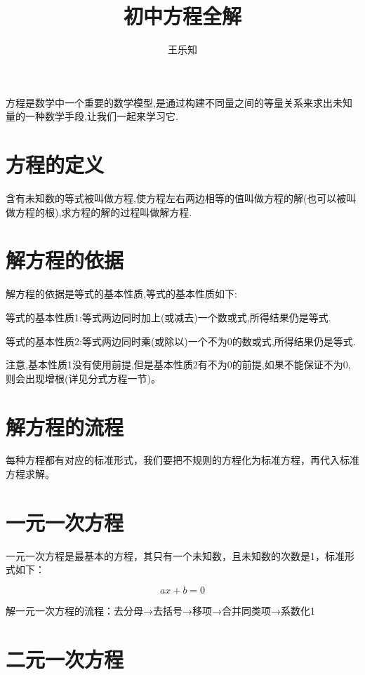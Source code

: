 \documentclass[UTF8]{ctexart}
\title{初中方程全解}
\author{王乐知}
\begin{document}
\maketitle

方程是数学中一个重要的数学模型,是通过构建不同量之间的等量关系来求出未知量的一种数学手段,让我们一起来学习它.

\section{方程的定义}

含有未知数的等式被叫做方程,使方程左右两边相等的值叫做方程的解(也可以被叫做方程的根),求方程的解的过程叫做解方程.

\section{解方程的依据}

解方程的依据是等式的基本性质,等式的基本性质如下:

等式的基本性质1:等式两边同时加上(或减去)一个数或式,所得结果仍是等式.

等式的基本性质2:等式两边同时乘(或除以)一个不为0的数或式,所得结果仍是等式.

注意,基本性质1没有使用前提,但是基本性质2有不为0的前提,如果不能保证不为0,则会出现增根(详见分式方程一节)。

\section{解方程的流程}

每种方程都有对应的标准形式，我们要把不规则的方程化为标准方程，再代入标准方程求解。

\section{一元一次方程}

一元一次方程是最基本的方程，其只有一个未知数，且未知数的次数是1，标准形式如下：

\[
ax+b=0
\]

解一元一次方程的流程：去分母→去括号→移项→合并同类项→系数化1

\section{二元一次方程}
\end{document}
